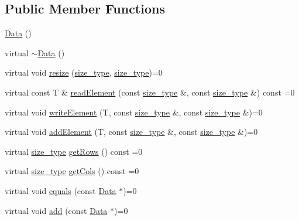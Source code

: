 \subsection*{Public Member Functions}
\begin{DoxyCompactItemize}
\item 
\hyperlink{classlmx_1_1Data_a9a0de5654dd527cac01f2dc52df86298}{Data} ()
\item 
virtual \hyperlink{classlmx_1_1Data_a74768723b5fb7c7eb5f26232b61ba02d}{$\sim$\-Data} ()
\item 
virtual void \hyperlink{classlmx_1_1Data_a2ef906e5218e1bc6d4df355787caedfc}{resize} (\hyperlink{lmx__mat__data_8h_a49b489a408a211a90e766329c0732d7b}{size\-\_\-type}, \hyperlink{lmx__mat__data_8h_a49b489a408a211a90e766329c0732d7b}{size\-\_\-type})=0
\item 
virtual const T \& \hyperlink{classlmx_1_1Data_a25cffd2f6d220d24e37b37a96205e0be}{read\-Element} (const \hyperlink{lmx__mat__data_8h_a49b489a408a211a90e766329c0732d7b}{size\-\_\-type} \&, const \hyperlink{lmx__mat__data_8h_a49b489a408a211a90e766329c0732d7b}{size\-\_\-type} \&) const =0
\item 
virtual void \hyperlink{classlmx_1_1Data_a41a4d2e19d1e150caff0d2011113f0fd}{write\-Element} (T, const \hyperlink{lmx__mat__data_8h_a49b489a408a211a90e766329c0732d7b}{size\-\_\-type} \&, const \hyperlink{lmx__mat__data_8h_a49b489a408a211a90e766329c0732d7b}{size\-\_\-type} \&)=0
\item 
virtual void \hyperlink{classlmx_1_1Data_ab99ee708ee4e9553be431d408eb2b43a}{add\-Element} (T, const \hyperlink{lmx__mat__data_8h_a49b489a408a211a90e766329c0732d7b}{size\-\_\-type} \&, const \hyperlink{lmx__mat__data_8h_a49b489a408a211a90e766329c0732d7b}{size\-\_\-type} \&)=0
\item 
virtual \hyperlink{lmx__mat__data_8h_a49b489a408a211a90e766329c0732d7b}{size\-\_\-type} \hyperlink{classlmx_1_1Data_a819b220b738028a01c5f861d059dd802}{get\-Rows} () const =0
\item 
virtual \hyperlink{lmx__mat__data_8h_a49b489a408a211a90e766329c0732d7b}{size\-\_\-type} \hyperlink{classlmx_1_1Data_a7dc130d0eba4c4d1dc4ce6e9a371251c}{get\-Cols} () const =0
\item 
virtual void \hyperlink{classlmx_1_1Data_a26ed4e8b9ba60ee57fc729e4cfcad356}{equals} (const \hyperlink{classlmx_1_1Data}{Data} $\ast$)=0
\item 
virtual void \hyperlink{classlmx_1_1Data_a7e09e2e81661176a36eb82818610223a}{add} (const \hyperlink{classlmx_1_1Data}{Data} $\ast$)=0

\end{DoxyCompactItemize}
